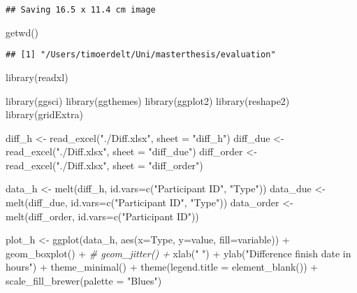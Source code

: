 \documentclass[
]{article}
\newenvironment{Shaded}{\begin{snugshade}}{\end{snugshade}}
\newcommand{\AttributeTok}[1]{\textcolor[rgb]{0.77,0.63,0.00}{#1}}
\newcommand{\CommentTok}[1]{\textcolor[rgb]{0.56,0.35,0.01}{\textit{#1}}}
\newcommand{\FunctionTok}[1]{\textcolor[rgb]{0.00,0.00,0.00}{#1}}
\newcommand{\NormalTok}[1]{#1}
\newcommand{\OtherTok}[1]{\textcolor[rgb]{0.56,0.35,0.01}{#1}}
\newcommand{\SpecialCharTok}[1]{\textcolor[rgb]{0.00,0.00,0.00}{#1}}
\newcommand{\StringTok}[1]{\textcolor[rgb]{0.31,0.60,0.02}{#1}}
\begin{document}
\begin{verbatim}
## Saving 16.5 x 11.4 cm image
\end{verbatim}

\begin{Shaded}
\begin{Highlighting}[]
\FunctionTok{getwd}\NormalTok{()}
\end{Highlighting}
\end{Shaded}

\begin{verbatim}
## [1] "/Users/timoerdelt/Uni/masterthesis/evaluation"
\end{verbatim}

\begin{Shaded}
\begin{Highlighting}[]
\FunctionTok{library}\NormalTok{(readxl)}

\FunctionTok{library}\NormalTok{(ggsci)}
\FunctionTok{library}\NormalTok{(ggthemes)}
\FunctionTok{library}\NormalTok{(ggplot2)}
\FunctionTok{library}\NormalTok{(reshape2)}
\FunctionTok{library}\NormalTok{(gridExtra)}

\NormalTok{diff\_h }\OtherTok{\textless{}{-}} \FunctionTok{read\_excel}\NormalTok{(}\StringTok{"./Diff.xlsx"}\NormalTok{, }\AttributeTok{sheet =} \StringTok{"diff\_h"}\NormalTok{)}
\NormalTok{diff\_due }\OtherTok{\textless{}{-}} \FunctionTok{read\_excel}\NormalTok{(}\StringTok{"./Diff.xlsx"}\NormalTok{, }\AttributeTok{sheet =} \StringTok{"diff\_due"}\NormalTok{)}
\NormalTok{diff\_order }\OtherTok{\textless{}{-}} \FunctionTok{read\_excel}\NormalTok{(}\StringTok{"./Diff.xlsx"}\NormalTok{, }\AttributeTok{sheet =} \StringTok{"diff\_order"}\NormalTok{)}

\NormalTok{data\_h }\OtherTok{\textless{}{-}} \FunctionTok{melt}\NormalTok{(diff\_h, }\AttributeTok{id.vars=}\FunctionTok{c}\NormalTok{(}\StringTok{"Participant ID"}\NormalTok{, }\StringTok{"Type"}\NormalTok{))}
\NormalTok{data\_due }\OtherTok{\textless{}{-}} \FunctionTok{melt}\NormalTok{(diff\_due, }\AttributeTok{id.vars=}\FunctionTok{c}\NormalTok{(}\StringTok{"Participant ID"}\NormalTok{, }\StringTok{"Type"}\NormalTok{))}
\NormalTok{data\_order }\OtherTok{\textless{}{-}} \FunctionTok{melt}\NormalTok{(diff\_order, }\AttributeTok{id.vars=}\FunctionTok{c}\NormalTok{(}\StringTok{"Participant ID"}\NormalTok{))}

\NormalTok{plot\_h }\OtherTok{\textless{}{-}} \FunctionTok{ggplot}\NormalTok{(data\_h, }\FunctionTok{aes}\NormalTok{(}\AttributeTok{x=}\NormalTok{Type, }\AttributeTok{y=}\NormalTok{value, }\AttributeTok{fill=}\NormalTok{variable)) }\SpecialCharTok{+} 
  \FunctionTok{geom\_boxplot}\NormalTok{() }\SpecialCharTok{+} 
  \CommentTok{\# geom\_jitter() +}
  \FunctionTok{xlab}\NormalTok{(}\StringTok{" "}\NormalTok{) }\SpecialCharTok{+} \FunctionTok{ylab}\NormalTok{(}\StringTok{"Difference finish date in hours"}\NormalTok{) }\SpecialCharTok{+} 
  \FunctionTok{theme\_minimal}\NormalTok{() }\SpecialCharTok{+} 
  \FunctionTok{theme}\NormalTok{(}\AttributeTok{legend.title =} \FunctionTok{element\_blank}\NormalTok{()) }\SpecialCharTok{+}
  \FunctionTok{scale\_fill\_brewer}\NormalTok{(}\AttributeTok{palette =} \StringTok{"Blues"}\NormalTok{)}


\end{Highlighting}
\end{Shaded}
\end{document}
